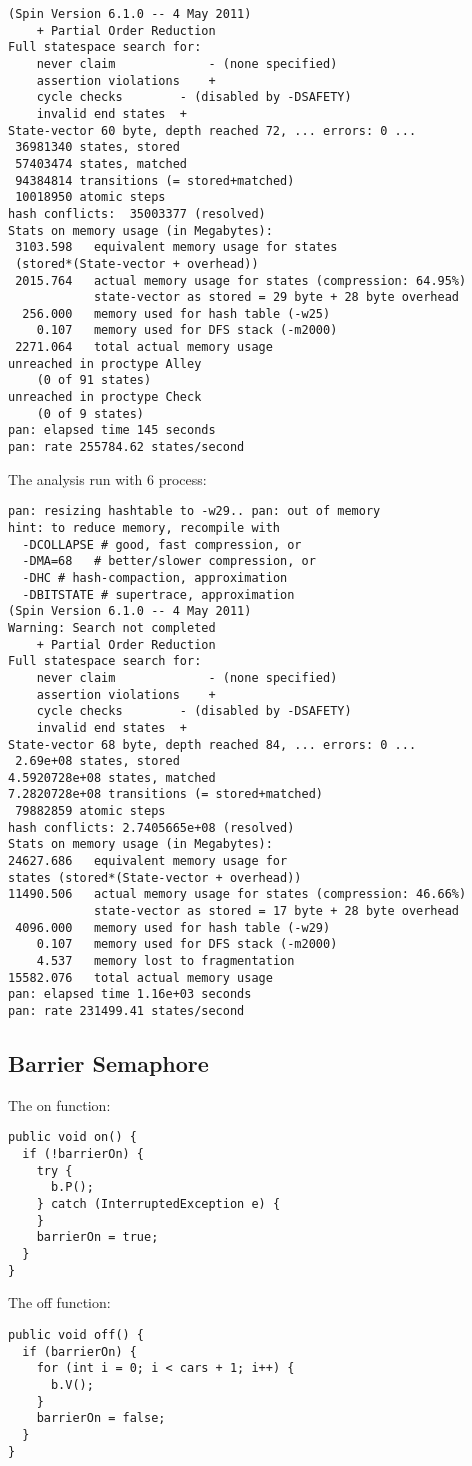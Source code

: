 \begin{lstlisting}
(Spin Version 6.1.0 -- 4 May 2011)
	+ Partial Order Reduction
Full statespace search for:
	never claim         	- (none specified)
	assertion violations	+
	cycle checks       	- (disabled by -DSAFETY)
	invalid end states	+
State-vector 60 byte, depth reached 72, ... errors: 0 ...
 36981340 states, stored
 57403474 states, matched
 94384814 transitions (= stored+matched)
 10018950 atomic steps
hash conflicts:  35003377 (resolved)
Stats on memory usage (in Megabytes):
 3103.598	equivalent memory usage for states 
 (stored*(State-vector + overhead))
 2015.764	actual memory usage for states (compression: 64.95%)
         	state-vector as stored = 29 byte + 28 byte overhead
  256.000	memory used for hash table (-w25)
    0.107	memory used for DFS stack (-m2000)
 2271.064	total actual memory usage
unreached in proctype Alley
	(0 of 91 states)
unreached in proctype Check
	(0 of 9 states)
pan: elapsed time 145 seconds
pan: rate 255784.62 states/second
\end{lstlisting}

The analysis run with 6 process:
\begin{lstlisting}
pan: resizing hashtable to -w29.. pan: out of memory
hint: to reduce memory, recompile with
  -DCOLLAPSE # good, fast compression, or
  -DMA=68   # better/slower compression, or
  -DHC # hash-compaction, approximation
  -DBITSTATE # supertrace, approximation
(Spin Version 6.1.0 -- 4 May 2011)
Warning: Search not completed
	+ Partial Order Reduction
Full statespace search for:
	never claim         	- (none specified)
	assertion violations	+
	cycle checks       	- (disabled by -DSAFETY)
	invalid end states	+
State-vector 68 byte, depth reached 84, ... errors: 0 ...
 2.69e+08 states, stored
4.5920728e+08 states, matched
7.2820728e+08 transitions (= stored+matched)
 79882859 atomic steps
hash conflicts: 2.7405665e+08 (resolved)
Stats on memory usage (in Megabytes):
24627.686	equivalent memory usage for 
states (stored*(State-vector + overhead))
11490.506	actual memory usage for states (compression: 46.66%)
         	state-vector as stored = 17 byte + 28 byte overhead
 4096.000	memory used for hash table (-w29)
    0.107	memory used for DFS stack (-m2000)
    4.537	memory lost to fragmentation
15582.076	total actual memory usage
pan: elapsed time 1.16e+03 seconds
pan: rate 231499.41 states/second
\end{lstlisting}

\subsection{Barrier Semaphore}
\label{sec:barrier}
The on function:
\begin{lstlisting}
public void on() {
  if (!barrierOn) {
    try {
      b.P();
    } catch (InterruptedException e) {
    }
    barrierOn = true;
  }
}
\end{lstlisting}
The off function:
\begin{lstlisting}
public void off() {
  if (barrierOn) {
    for (int i = 0; i < cars + 1; i++) {
      b.V();
    }
    barrierOn = false;
  }
}
\end{lstlisting}


